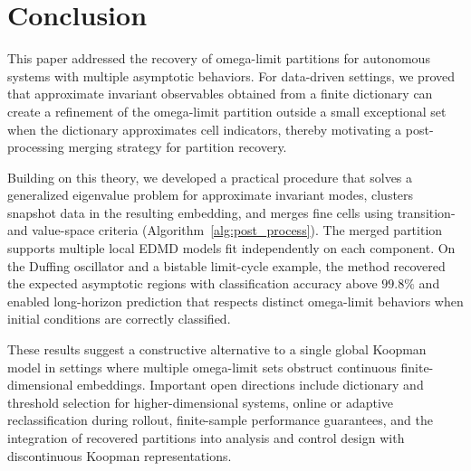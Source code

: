 \documentclass[letterpaper, 10 pt, conference]{ieeeconf}
\newcommand{\biblink}{bib_abs}
\begin{document}
\section{Conclusion}
This paper addressed the recovery of omega-limit partitions for autonomous systems with multiple asymptotic behaviors. For data-driven settings, we proved that approximate invariant observables obtained from a finite dictionary can create a refinement of the omega-limit partition outside a small exceptional set when the dictionary approximates cell indicators, thereby motivating a post-processing merging strategy for partition recovery.

Building on this theory, we developed a practical procedure that solves a generalized eigenvalue problem for approximate invariant modes, clusters snapshot data in the resulting embedding, and merges fine cells using transition- and value-space criteria (Algorithm~\ref{alg:post_process}). The merged partition supports multiple local EDMD models fit independently on each component. On the Duffing oscillator and a bistable limit-cycle example, the method recovered the expected asymptotic regions with classification accuracy above $99.8\%$ and enabled long-horizon prediction that respects distinct omega-limit behaviors when initial conditions are correctly classified.

These results suggest a constructive alternative to a single global Koopman model in settings where multiple omega-limit sets obstruct continuous finite-dimensional embeddings. Important open directions include dictionary and threshold selection for higher-dimensional systems, online or adaptive reclassification during rollout, finite-sample performance guarantees, and the integration of recovered partitions into analysis and control design with discontinuous Koopman representations.



\end{document}
